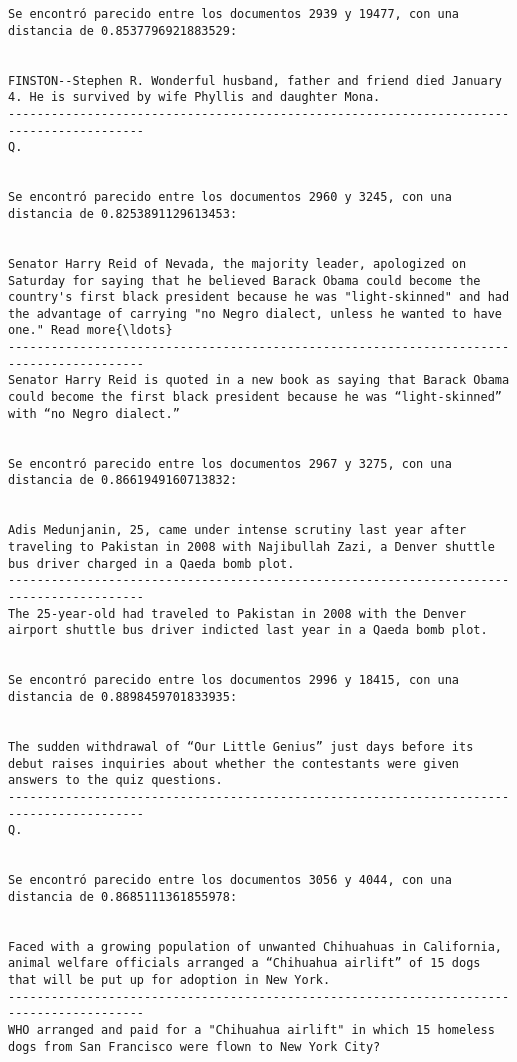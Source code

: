 \documentclass[11pt]{article}
\begin{document}
\begin{Verbatim}[commandchars=\\\{\}]
Se encontró parecido entre los documentos 2939 y 19477, con una distancia de 0.8537796921883529:


FINSTON--Stephen R. Wonderful husband, father and friend died January 4. He is survived by wife Phyllis and daughter Mona.
-----------------------------------------------------------------------------------------
Q.


Se encontró parecido entre los documentos 2960 y 3245, con una distancia de 0.8253891129613453:


Senator Harry Reid of Nevada, the majority leader, apologized on Saturday for saying that he believed Barack Obama could become the country's first black president because he was "light-skinned" and had the advantage of carrying "no Negro dialect, unless he wanted to have one." Read more{\ldots}
-----------------------------------------------------------------------------------------
Senator Harry Reid is quoted in a new book as saying that Barack Obama could become the first black president because he was “light-skinned” with “no Negro dialect.”


Se encontró parecido entre los documentos 2967 y 3275, con una distancia de 0.8661949160713832:


Adis Medunjanin, 25, came under intense scrutiny last year after traveling to Pakistan in 2008 with Najibullah Zazi, a Denver shuttle bus driver charged in a Qaeda bomb plot.
-----------------------------------------------------------------------------------------
The 25-year-old had traveled to Pakistan in 2008 with the Denver airport shuttle bus driver indicted last year in a Qaeda bomb plot.


Se encontró parecido entre los documentos 2996 y 18415, con una distancia de 0.8898459701833935:


The sudden withdrawal of “Our Little Genius” just days before its debut raises inquiries about whether the contestants were given answers to the quiz questions.
-----------------------------------------------------------------------------------------
Q.


Se encontró parecido entre los documentos 3056 y 4044, con una distancia de 0.8685111361855978:


Faced with a growing population of unwanted Chihuahuas in California, animal welfare officials arranged a “Chihuahua airlift” of 15 dogs that will be put up for adoption in New York.
-----------------------------------------------------------------------------------------
WHO arranged and paid for a "Chihuahua airlift" in which 15 homeless dogs from San Francisco were flown to New York City?



\end{Verbatim}
\end{document}
